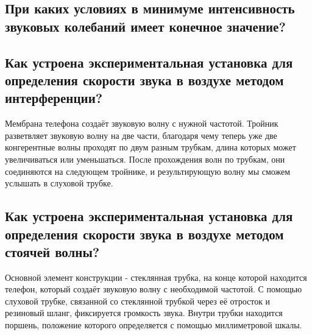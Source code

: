 \documentclass[otchet]{SCWorks}
\begin{document}
\subsection{При каких условиях в минимуме интенсивность звуковых колебаний имеет конечное значение?}

\subsection{Как устроена экспериментальная установка для определения скорости звука в воздухе методом интерференции?}
Мембрана телефона создаёт звуковую волну с нужной частотой. Тройник разветвляет звуковую волну на две части, благодаря чему теперь уже две конгерентные волны проходят по двум разным трубкам, длина которых может увеличиваться или уменьшаться. После прохождения волн по трубкам, они соединяются на следующем тройнике, и результирующую волну мы сможем услышать в слуховой трубке.
\subsection{Как устроена экспериментальная установка для определения скорости звука в воздухе методом стоячей волны?}
Основной элемент конструкции - стеклянная трубка, на конце которой находится телефон, который создаёт звуковую волну с необходимой частотой. С помощью слуховой трубке, связанной со стеклянной трубкой через её отросток и резиновый шланг, фиксируется громкость звука. Внутри трубки находится поршень, положение которого определяется с помощью миллиметровой шкалы.



%


% 
% 


\appendix
\end{document}
